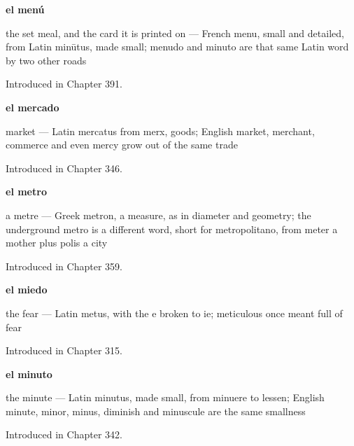 \noindent\begin{minipage}[t]{\linewidth}
\raggedright
\textbf{el menú}\par
\small the set meal, and the card it is printed on — French menu, small and detailed, from Latin minūtus, made small; menudo and minuto are that same Latin word by two other roads\par
\footnotesize Introduced in Chapter 391.
\end{minipage}\par\medskip

\noindent\begin{minipage}[t]{\linewidth}
\raggedright
\textbf{el mercado}\par
\small market — Latin mercatus from merx, goods; English market, merchant, commerce and even mercy grow out of the same trade\par
\footnotesize Introduced in Chapter 346.
\end{minipage}\par\medskip

\noindent\begin{minipage}[t]{\linewidth}
\raggedright
\textbf{el metro}\par
\small a metre — Greek metron, a measure, as in diameter and geometry; the underground metro is a different word, short for metropolitano, from meter a mother plus polis a city\par
\footnotesize Introduced in Chapter 359.
\end{minipage}\par\medskip

\noindent\begin{minipage}[t]{\linewidth}
\raggedright
\textbf{el miedo}\par
\small the fear — Latin metus, with the e broken to ie; meticulous once meant full of fear\par
\footnotesize Introduced in Chapter 315.
\end{minipage}\par\medskip

\noindent\begin{minipage}[t]{\linewidth}
\raggedright
\textbf{el minuto}\par
\small the minute — Latin minutus, made small, from minuere to lessen; English minute, minor, minus, diminish and minuscule are the same smallness\par
\footnotesize Introduced in Chapter 342.
\end{minipage}\par\medskip

